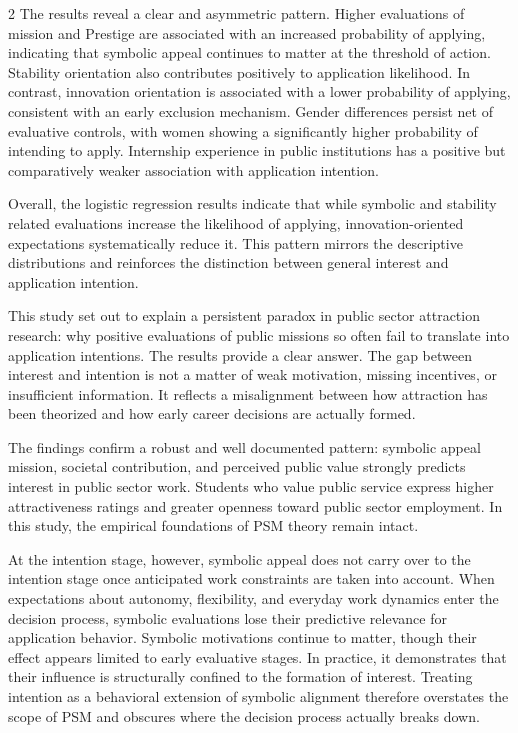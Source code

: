 \begin{multicols}{2}
The results reveal a clear and asymmetric pattern. Higher evaluations of
mission and Prestige are associated with an increased probability of
applying, indicating that symbolic appeal continues to matter at the
threshold of action. Stability orientation also contributes positively
to application likelihood. In contrast, innovation orientation is
associated with a lower probability of applying, consistent with an
early exclusion mechanism. Gender differences persist net of evaluative
controls, with women showing a significantly higher probability of
intending to apply. Internship experience in public institutions has a
positive but comparatively weaker association with application
intention.

Overall, the logistic regression results indicate that while symbolic
and stability related evaluations increase the likelihood of applying,
innovation-oriented expectations systematically reduce it. This pattern
mirrors the descriptive distributions and reinforces the distinction
between general interest and application intention.

This study set out to explain a persistent paradox in public sector
attraction research: why positive evaluations of public missions so
often fail to translate into application intentions. The results provide
a clear answer. The gap between interest and intention is not a matter
of weak motivation, missing incentives, or insufficient information. It
reflects a misalignment between how attraction has been theorized and
how early career decisions are actually formed.

The findings confirm a robust and well documented pattern: symbolic
appeal mission, societal contribution, and perceived public value
strongly predicts interest in public sector work. Students who value
public service express higher attractiveness ratings and greater
openness toward public sector employment. In this study, the empirical
foundations of PSM theory remain intact.

At the intention stage, however, symbolic appeal does not carry over to
the intention stage once anticipated work constraints are taken into
account. When expectations about autonomy, flexibility, and everyday
work dynamics enter the decision process, symbolic evaluations lose
their predictive relevance for application behavior. Symbolic
motivations continue to matter, though their effect appears limited to
early evaluative stages. In practice, it demonstrates that their
influence is structurally confined to the formation of interest.
Treating intention as a behavioral extension of symbolic alignment
therefore overstates the scope of PSM and obscures where the decision
process actually breaks down.


\end{multicols}
